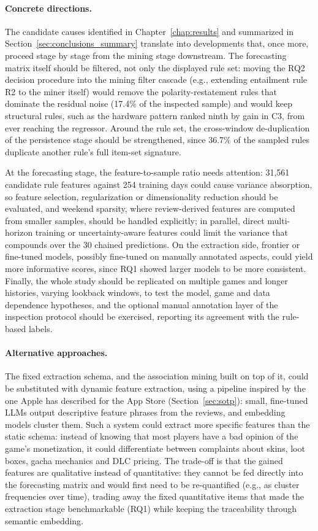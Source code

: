 \paragraph{Concrete directions.} The candidate causes identified in Chapter~\ref{chap:results} and summarized in Section~\ref{sec:conclusions_summary} translate into developments that, once more, proceed stage by stage from the mining stage downstream. The forecasting matrix itself should be filtered, not only the displayed rule set: moving the RQ2 decision procedure into the mining filter cascade (e.g., extending entailment rule R2 to the miner itself) would remove the polarity-restatement rules that dominate the residual noise (17.4\% of the inspected sample) and would keep structural rules, such as the hardware pattern ranked ninth by gain in C3, from ever reaching the regressor. Around the rule set, the cross-window de-duplication of the persistence stage should be strengthened, since 36.7\% of the sampled rules duplicate another rule's full item-set signature.

At the forecasting stage, the feature-to-sample ratio needs attention: 31{,}561 candidate rule features against 254 training days could cause variance absorption, so feature selection, regularization or dimensionality reduction should be evaluated, and weekend sparsity, where review-derived features are computed from smaller samples, should be handled explicitly; in parallel, direct multi-horizon training or uncertainty-aware features could limit the variance that compounds over the 30 chained predictions. On the extraction side, frontier or fine-tuned models, possibly fine-tuned on manually annotated aspects, could yield more informative scores, since RQ1 showed larger models to be more consistent. Finally, the whole study should be replicated on multiple games and longer histories, varying lookback windows, to test the model, game and data dependence hypotheses, and the optional manual annotation layer of the inspection protocol should be exercised, reporting its agreement with the rule-based labels.

\paragraph{Alternative approaches.} The fixed extraction schema, and the association mining built on top of it, could be substituted with dynamic feature extraction, using a pipeline inspired by the one Apple has described for the App Store (Section~\ref{sec:sotp}): small, fine-tuned LLMs output descriptive feature phrases from the reviews, and embedding models cluster them. Such a system could extract more specific features than the static schema: instead of knowing that most players have a bad opinion of the game's monetization, it could differentiate between complaints about skins, loot boxes, gacha mechanics and DLC pricing. The trade-off is that the gained features are qualitative instead of quantitative: they cannot be fed directly into the forecasting matrix and would first need to be re-quantified (e.g., as cluster frequencies over time), trading away the fixed quantitative items that made the extraction stage benchmarkable (RQ1) while keeping the traceability through semantic embedding.


